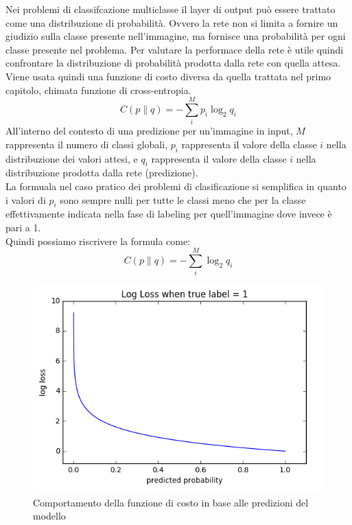 \documentclass[12pt,a4paper,openright,twoside]{report}
\begin{document}
Nei problemi di classifcazione multiclasse il layer di output può essere trattato come una distribuzione di probabilità. Ovvero la rete non si limita a fornire un giudizio sulla classe presente nell'immagine, ma fornisce una probabilità per ogni classe presente nel problema.
Per valutare la performace della rete è utile quindi confrontare la distribuzione di probabilità prodotta dalla rete con quella attesa.
\newpage
Viene usata quindi una funzione di costo diversa da quella trattata nel primo capitolo, chimata funzione di cross-entropia.
\begin{equation}
    C\left(p\|q\right)=-\sum _{i}^{M}p_{i}\log _{2}q_{i}
\end{equation}
All'interno del contesto di una predizione per un'immagine in input, $M$ rappresenta il numero di classi globali, $p_{i}$ rappresenta il valore della classe $i$ nella distribuzione dei valori attesi, e $q_{i}$ rappresenta il valore della classe $i$ nella distribuzione prodotta dalla rete (predizione).\\
La formuala nel caso pratico dei problemi di clasificazione si semplifica in quanto i valori di $p_{i}$ sono sempre nulli per tutte le classi meno che per la classe effettivamente indicata nella fase di labeling per quell'immagine dove invece è pari a 1. \\ Quindi possiamo riscrivere la formula come: 
\begin{equation}
    C\left(p\|q\right)=-\sum _{i}^{M}\log _{2}q_{i}
\end{equation}
\begin{figure}[h]
\centering
\includegraphics[width=\linewidth]{cross_entropy.png}
\caption{Comportamento della funzione di costo in base alle predizioni del modello}
\end{figure}
\end{document}
